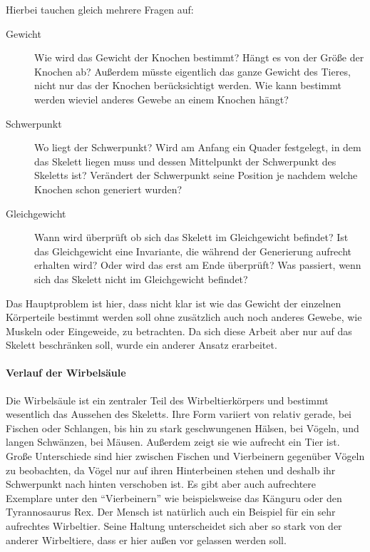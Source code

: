 Hierbei tauchen gleich mehrere Fragen auf:
\begin{description}
 \item[Gewicht] Wie wird das Gewicht der Knochen bestimmt? Hängt es von der Größe der Knochen ab? Außerdem müsste eigentlich das ganze Gewicht des Tieres, nicht nur das der Knochen berücksichtigt werden. Wie kann bestimmt werden wieviel anderes Gewebe an einem Knochen hängt?
 
 \item[Schwerpunkt] Wo liegt der Schwerpunkt? Wird am Anfang ein Quader festgelegt, in dem das Skelett liegen muss und dessen Mittelpunkt der Schwerpunkt des Skeletts ist? Verändert der Schwerpunkt seine Position je nachdem welche Knochen schon generiert wurden?
 
 \item[Gleichgewicht] Wann wird überprüft ob sich das Skelett im Gleichgewicht befindet? Ist das Gleichgewicht eine Invariante, die während der Generierung aufrecht erhalten wird? Oder wird das erst am Ende überprüft? Was passiert, wenn sich das Skelett nicht im Gleichgewicht befindet?
\end{description}
 
Das Hauptproblem ist hier, dass nicht klar ist wie das Gewicht der einzelnen Körperteile bestimmt werden soll ohne zusätzlich auch noch anderes Gewebe, wie Muskeln oder Eingeweide, zu betrachten. Da sich diese Arbeit aber nur auf das Skelett beschränken soll, wurde ein anderer Ansatz erarbeitet.

\paragraph{Verlauf der Wirbelsäule}
Die Wirbelsäule ist ein zentraler Teil des Wirbeltierkörpers und bestimmt wesentlich das Aussehen des Skeletts.
Ihre Form variiert von relativ gerade, \zb bei Fischen oder Schlangen, bis hin zu stark geschwungenen Hälsen, \va bei Vögeln, und langen Schwänzen, \zb bei Mäusen. Außerdem zeigt sie wie aufrecht ein Tier ist. Große Unterschiede sind hier zwischen Fischen und Vierbeinern gegenüber Vögeln zu beobachten, da Vögel nur auf ihren Hinterbeinen stehen und deshalb ihr Schwerpunkt nach hinten verschoben ist. Es gibt aber auch aufrechtere Exemplare unter den "`Vierbeinern"' wie beispielsweise das Känguru oder den Tyrannosaurus Rex.
Der Mensch ist natürlich auch ein Beispiel für ein sehr aufrechtes Wirbeltier. Seine Haltung unterscheidet sich aber so stark von der anderer Wirbeltiere, dass er hier außen vor gelassen werden soll.

